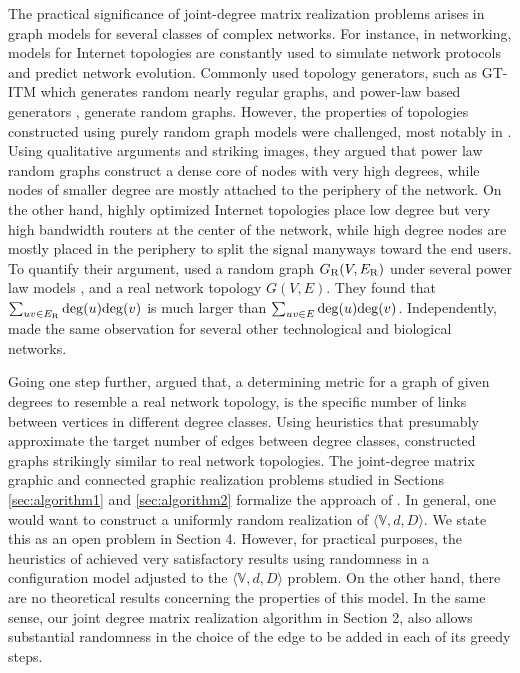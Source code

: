 \documentclass[12pt,a4paper]{article}
\theoremstyle{definition}
\theoremstyle{plain}
\begin{document}
The practical significance of joint-degree
matrix realization problems arises in graph
models for several classes of complex networks.
For instance, in networking, models for Internet
topologies are constantly used to simulate
network protocols and predict network evolution.
Commonly used topology generators, such as
GT-ITM \cite{Zegura2,Zegura3} which generates random nearly regular graphs,
and power-law based generators \cite{Faloutsos,ACL1,ACL2,Brite2,Inet,ALENEX03}, generate random graphs.
However, the properties of topologies constructed using
purely random graph models were challenged,
most notably in \cite{hot2,alderson}.
Using qualitative arguments and striking images,
they argued that 
power law random graphs construct a dense core
of nodes with very high degrees,
while nodes of smaller degree are mostly attached to the periphery of the
network. On the other hand, highly optimized Internet topologies
place low degree but very high bandwidth routers at the center of the network,
while high degree nodes are mostly placed in the periphery
to split the signal manyways toward the end users. 
To quantify their argument, \cite{alderson} used a random graph 
$G_{\rm R}(V,E_{\rm R})$
under several power law 
models \cite{nsbook2,nsbook3,chungbook2,newmanbook,durrettbook},
and a real network topology $G(V,E)$.
They found that
$\sum_{uv \in E_{\rm R}} {\rm deg}(u) {\rm deg}(v)$  
is much larger than
$\sum_{uv \in E} {\rm deg}(u) {\rm deg}(v)$.
Independently, \cite{Newman1,Newman5} made the same observation
for several other technological and biological networks.

Going one step further, \cite{UCSDnet1,UCSDnet2}
argued that, 
a determining metric
for a graph of given degrees
to resemble a real network topology,
is the specific number of links
between vertices in different degree classes.
Using heuristics that presumably approximate
the target number of edges between degree classes, 
\cite{UCSDnet2} constructed graphs
strikingly similar to real network topologies. 
The joint-degree matrix graphic and connected graphic realization problems 
studied in Sections \ref{sec:algorithm1} and \ref{sec:algorithm2}
formalize the approach of \cite{UCSDnet1,UCSDnet2}. In general, one would want 
to construct a uniformly random realization of $\langle{\mathbb V},d,D\rangle$.
We state this as an open problem in Section 4. However, for practical purposes, 
the heuristics of \cite{UCSDnet1,UCSDnet2} achieved very satisfactory results 
using randomness in a configuration model adjusted to the $\langle{\mathbb V},d,D\rangle$ problem.
On the other hand, there are no theoretical results concerning the properties of this model.
In the same sense, our joint degree matrix realization algorithm in Section 2, also
allows substantial randomness in the choice of the edge to be added in each of its greedy steps.
\end{document}
